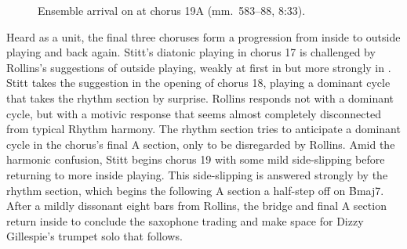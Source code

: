 \begin{figure}[tbp]
  \caption[Ensemble arrival on \protect\h{Bmaj7} at chorus
  \protect{}.]{%
    Ensemble arrival on \protect{} at chorus
    {\protect\ssliningfont19A} (mm.~583--88, 8:33).}
  \label{et:ens-side-slipping}
\end{figure}

Heard as a unit, the final three choruses form a progression from inside to
outside playing and back again. Stitt's diatonic playing in chorus 17 is
challenged by Rollins's suggestions of outside playing, weakly at first in
 but more strongly in . Stitt takes the suggestion in
the opening of chorus 18, playing a dominant cycle that takes the rhythm
section by surprise. Rollins responds not with a dominant cycle, but with a
motivic response that seems almost completely disconnected from typical Rhythm
harmony. The rhythm section tries to anticipate a dominant cycle in the
chorus's final A section, only to be disregarded by Rollins. Amid the
harmonic confusion, Stitt begins chorus 19 with some mild side-slipping before
returning to more inside playing. This side-slipping is answered strongly by
the rhythm section, which begins the following A section a half-step off on
\h{Bmaj7}. After a mildly dissonant eight bars from Rollins, the bridge and
final A section return inside to conclude the saxophone trading and make space
for Dizzy Gillespie's trumpet solo that follows.



